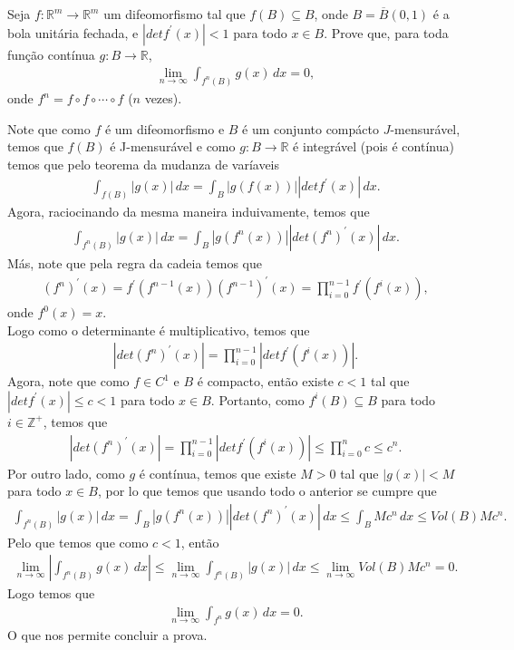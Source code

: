 \begin{homeworkProblem}[Seção 5-4]
  Seja $f:\mathbb{R}^{m}\to\mathbb{R}^{m}$ um difeomorfismo tal que $f(B)\subseteq B$, onde $B=\overline{B}(0,1)$ é a bola unitária fechada, e $|det f^{\prime}(x)|<1$ para todo $x\in B$. Prove que, para toda função contínua $g:B\to\mathbb{R}$,
  \begin{align*}
    \lim_{n \to \infty}\int_{f^{n}(B)}g(x)\,dx=0,
  \end{align*}
  onde $f^{n}=f\circ f\circ \cdots\circ f$ ($n$ vezes). 
  \begin{solution}
    Note que como $f$ é um difeomorfismo e $B$ é um conjunto compácto $J$-mensurável, temos que $f(B)$ é J-mensurável e como $g:B\to\mathbb{R}$ é integrável (pois é contínua) temos que pelo teorema da mudanza de varíaveis
    \begin{align*}
      \int_{f(B)}|g(x)|\,dx=\int_{B}|g(f(x))||det f^{\prime}(x)|\,dx.
    \end{align*}
    Agora, raciocinando da mesma maneira induivamente, temos que
    \begin{align*}
      \int_{f^{n}(B)}|g(x)|\,dx=\int_{B}|g(f^{n}(x))||det (f^{n})^{\prime}(x)|\,dx.
    \end{align*}
    Más, note que pela regra da cadeia temos que
    \begin{align*}
      (f^{n})^{\prime}(x)=f^{\prime}(f^{n-1}(x))(f^{n-1})^{\prime}(x)=\prod_{i=0}^{n-1}f^{\prime}(f^{i}(x)),
    \end{align*}
    onde $f^{0}(x)=x$.\\
    Logo como o determinante é multiplicativo, temos que
    \begin{align*}
      |det (f^{n})^{\prime}(x)|=\prod_{i=0}^{n-1}|det f^{\prime}(f^{i}(x))|.
    \end{align*}
    Agora, note que como $f\in C^{1}$ e $B$ é compacto, então existe $c<1$ tal que $|det f^{\prime}(x)|\leq c<1$ para todo $x\in B$. Portanto, como $f^{i}(B)\subseteq B$ para todo $i\in\mathbb{Z}^{+}$, temos que
    \begin{align*}
      |det (f^{n})^{\prime}(x)|=\prod_{i=0}^{n-1}|det f^{\prime}(f^{i}(x))|\leq\prod_{i=0}^{n}c\leq c^{n}.
    \end{align*}
    Por outro lado, como $g$ é contínua, temos que existe $M>0$ tal que $|g(x)|<M$ para todo $x\in B$, por lo que temos que usando todo o anterior se cumpre que
    \begin{align*}
      \int_{f^{n}(B)}|g(x)|\,dx=\int_{B}|g(f^{n}(x))||det(f^{n})^{\prime}(x)|\,dx\leq \int_{B}Mc^{n}\,dx\leq Vol(B)Mc^{n}.
    \end{align*}
    Pelo que temos que como $c<1$, então
    \begin{align*}
      \lim_{n \to \infty}\left| \int_{f^{n}(B)}g(x)\,dx \right|\leq\lim_{n \to \infty}\int_{f^{n}(B)}|g(x)|\,dx\leq \lim_{n \to \infty}Vol(B)Mc^{n}=0.
    \end{align*}
    Logo temos que
    \begin{align*}
      \lim_{n \to \infty}\int_{f^{n}}g(x)\,dx=0.
    \end{align*}
    O que nos permite concluir a prova.
  \end{solution}
\end{homeworkProblem}
